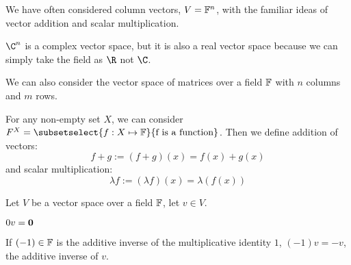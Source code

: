 \documentclass[../Main.tex]{subfiles}
\begin{document}
\begin{example}
    We have often considered column vectors, $V = \mathbb{F}^n$, with the familiar ideas of vector addition and scalar multiplication.

    $\C^n$ is a complex vector space, but it is also a real vector space because we can simply take the field as $\R$ not $\C$.
\end{example}
\begin{example}
    We can also consider the vector space of matrices over a field $\mathbb{F}$ with $n$ columns and $m$ rows.
\end{example}
\begin{example}
    For any non-empty set $X$, we can consider $F^X = \subsetselect{f : X \mapsto \F}{\text{f is a function}}$. Then we define addition of vectors:
    \begin{equation*}
        f+g := (f + g)(x) = f(x) + g(x)
    \end{equation*}
    and scalar multiplication:
    \begin{equation*}
        \lambda f := (\lambda f)(x) = \lambda (f(x))
    \end{equation*}
\end{example}
\begin{propositions}{
        Let $V$ be a vector space over a field $\mathbb{F}$, let $v \in V$.
    }
    \item $0v = \boldsymbol{0}$ \label{propZeroVector}
    \item If $(-1) \in \mathbb{F}$ is the additive inverse of the multiplicative identity $1$, $(-1)v = -v$, the additive inverse of $v$. \label{propNegativeVector}
    \label{propsSpecialVectors}
\end{propositions}
\end{document}

